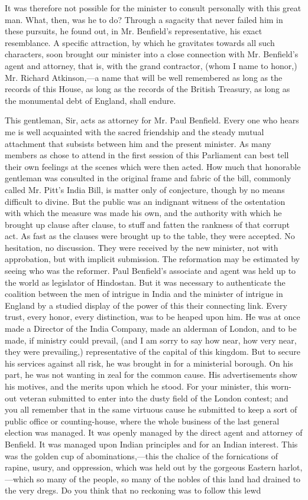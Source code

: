 It was therefore not possible for the minister to consult personally with this great man. What, then, was he to do? Through a sagacity that never failed him in these pursuits, he found out, in Mr. Benfield's representative, his exact resemblance. A specific attraction, by which he gravitates towards all such characters, soon brought our minister into a close connection with Mr. Benfield's agent and attorney, that is, with the grand contractor, (whom I name to honor,) Mr. Richard Atkinson,—a name that will be well remembered as long as the records of this House, as long as the records of the British Treasury, as long as the monumental debt of England, shall endure.

This gentleman, Sir, acts as attorney for Mr. Paul Benfield. Every one who hears me is well acquainted with the sacred friendship and the steady mutual attachment that subsists between him and the present minister. As many members as chose to attend in the first session of this Parliament can best tell their own feelings at the scenes which were then acted. How much that honorable gentleman was consulted in the original frame and fabric of the bill, commonly called Mr. Pitt's India Bill, is matter only of conjecture, though by no means difficult to divine. But the public was an indignant witness of the ostentation with which the measure was made his own, and the authority with which he brought up clause after clause, to stuff and fatten the rankness of that corrupt act. As fast as the clauses were brought up to the table, they were accepted. No hesitation, no discussion. They were received by the new minister, not with approbation, but with implicit submission. The reformation may be estimated by seeing who was the reformer. Paul Benfield's associate and agent was held up to the world as legislator of Hindostan. But it was necessary to authenticate the coalition between the men of intrigue in India and the minister of intrigue in England by a studied display of the power of this their connecting link. Every trust, every honor, every distinction, was to be heaped upon him. He was at once made a Director of the India Company, made an alderman of London, and to be made, if ministry could prevail, (and I am sorry to say how near, how very near, they were prevailing,) representative of the capital of this kingdom. But to secure his services against all risk, he was brought in for a ministerial borough. On his part, he was not wanting in zeal for the common cause. His advertisements show his motives, and the merits upon which he stood. For your minister, this worn-out veteran submitted to enter into the dusty field of the London contest; and you all remember that in the same virtuous cause he submitted to keep a sort of public office or counting-house, where the whole business of the last general election was managed. It was openly managed by the direct agent and attorney of Benfield. It was managed upon Indian principles and for an Indian interest. This was the golden cup of abominations,—this the chalice of the fornications of rapine, usury, and oppression, which was held out by the gorgeous Eastern harlot,—which so many of the people, so many of the nobles of this land had drained to the very dregs. Do you think that no reckoning was to follow this lewd 